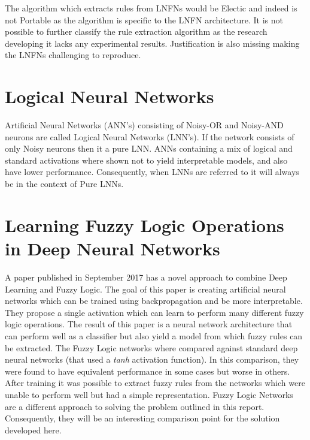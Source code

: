 The algorithm which extracts rules from LNFNs would be Electic and indeed is not Portable as the algorithm is specific to the LNFN architecture. It is not possible to further classify the rule extraction algorithm as the research developing it lacks any experimental results. Justification is also missing making the LNFNs challenging to reproduce.

\section{Logical Neural Networks}
Artificial Neural Networks (ANN's) consisting of Noisy-OR and Noisy-AND neurons are called Logical Neural Networks \cite{LearningLogicalActivations} (LNN's). If the network consists of only Noisy neurons then it a pure LNN. ANNs containing a mix of logical and standard activations where shown not to yield interpretable models, and also have lower performance. Consequently, when LNNs are referred to it will always be in the context of Pure LNNs.


\section{Learning Fuzzy Logic Operations in Deep Neural Networks}
A paper published in September 2017 \cite{godfrey2017parameterized} has a novel approach to combine Deep Learning and Fuzzy Logic. The goal of this paper is creating artificial neural networks which can be trained using backpropagation and be more interpretable. They propose a single activation which can learn to perform many different fuzzy logic operations. The result of this paper is a neural network architecture that can perform well as a classifier but also yield a model from which fuzzy rules can be extracted. The Fuzzy Logic networks where compared against standard deep neural networks (that used a \textit{tanh} activation function). In this comparison, they were found to have equivalent performance in some cases but worse in others. After training it was possible to extract fuzzy rules from the networks which were unable to perform well but had a simple representation. Fuzzy Logic Networks are a different approach to solving the problem outlined in this report. Consequently, they will be an interesting comparison point for the solution developed here.

